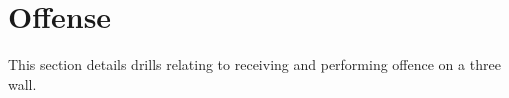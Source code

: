 \section*{Offense}
\label{sec:three_wall:offense}

This section details drills relating to receiving and performing offence on a three wall.
